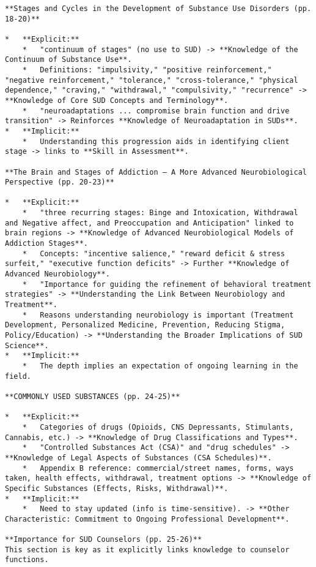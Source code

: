 \documentclass[
  letterpaper,
  DIV=11,
  numbers=noendperiod]{scrartcl}
\begin{document}
\begin{verbatim}
**Stages and Cycles in the Development of Substance Use Disorders (pp. 18-20)**

*   **Explicit:**
    *   "continuum of stages" (no use to SUD) -> **Knowledge of the Continuum of Substance Use**.
    *   Definitions: "impulsivity," "positive reinforcement," "negative reinforcement," "tolerance," "cross-tolerance," "physical dependence," "craving," "withdrawal," "compulsivity," "recurrence" -> **Knowledge of Core SUD Concepts and Terminology**.
    *   "neuroadaptations ... compromise brain function and drive transition" -> Reinforces **Knowledge of Neuroadaptation in SUDs**.
*   **Implicit:**
    *   Understanding this progression aids in identifying client stage -> links to **Skill in Assessment**.

**The Brain and Stages of Addiction – A More Advanced Neurobiological Perspective (pp. 20-23)**

*   **Explicit:**
    *   "three recurring stages: Binge and Intoxication, Withdrawal and Negative affect, and Preoccupation and Anticipation" linked to brain regions -> **Knowledge of Advanced Neurobiological Models of Addiction Stages**.
    *   Concepts: "incentive salience," "reward deficit & stress surfeit," "executive function deficits" -> Further **Knowledge of Advanced Neurobiology**.
    *   "Importance for guiding the refinement of behavioral treatment strategies" -> **Understanding the Link Between Neurobiology and Treatment**.
    *   Reasons understanding neurobiology is important (Treatment Development, Personalized Medicine, Prevention, Reducing Stigma, Policy/Education) -> **Understanding the Broader Implications of SUD Science**.
*   **Implicit:**
    *   The depth implies an expectation of ongoing learning in the field.

**COMMONLY USED SUBSTANCES (pp. 24-25)**

*   **Explicit:**
    *   Categories of drugs (Opioids, CNS Depressants, Stimulants, Cannabis, etc.) -> **Knowledge of Drug Classifications and Types**.
    *   "Controlled Substances Act (CSA)" and "drug schedules" -> **Knowledge of Legal Aspects of Substances (CSA Schedules)**.
    *   Appendix B reference: commercial/street names, forms, ways taken, health effects, withdrawal, treatment options -> **Knowledge of Specific Substances (Effects, Risks, Withdrawal)**.
*   **Implicit:**
    *   Need to stay updated (info is time-sensitive). -> **Other Characteristic: Commitment to Ongoing Professional Development**.

**Importance for SUD Counselors (pp. 25-26)**
This section is key as it explicitly links knowledge to counselor functions.


\end{verbatim}
\end{document}
